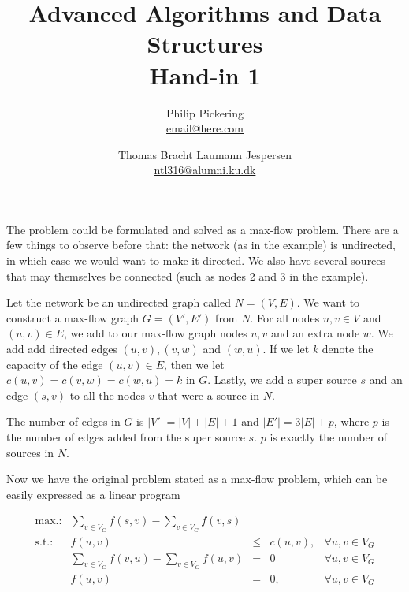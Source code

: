 \documentclass{article}
\author{Philip Pickering\\\url{email@here.com} \and Thomas Bracht Laumann Jespersen\\\url{ntl316@alumni.ku.dk}}
\title{Advanced Algorithms and Data Structures\\Hand-in 1}
\date{}
\begin{document}
\maketitle

The problem could be formulated and solved as a max-flow
problem. There are a few things to observe before that: the network
(as in the example) is undirected, in which case we would want to make
it directed. We also have several sources that may themselves be
connected (such as nodes 2 and 3 in the example).


Let the network be an undirected graph called $N = (V,E)$. We want to
construct a max-flow graph $G = (V',E')$ from $N$. For all nodes
$u,v\in V$ and $(u,v)\in E$, we add to our max-flow 
graph nodes $u, v$ and an extra node $w$. We add add directed edges
$(u,v), (v,w)$ and $(w,u)$. If we let $k$ denote the capacity of the
edge $(u,v)\in E$, then we let $c(u,v) = c(v,w) = c(w,u) = k$ in
$G$. Lastly, we add a super source $s$ and an edge $(s,v)$ to all the
nodes $v$ that were a source in $N$.

The number of edges in $G$ is $|V'| = |V| + |E| + 1 $ and $|E'| = 3|E|
+ p$, where $p$ is the number of edges added from the super source
$s$. $p$ is exactly the number of sources in $N$.

Now we have the original problem stated as a max-flow problem, which
can be easily expressed as a linear program

\[
\begin{array}{lrcll}
\textrm{max.:} & \displaystyle\sum_{v\in V_G} f(s,v) -\displaystyle\sum_{v\in V_G} f(v,s) &     & & \\
\textrm{s.t.:} &  f(u,v)                &\leq & c(u,v),  &\forall u,v\in V_G\\
              &  \displaystyle\sum_{v\in V_G}f(v,u) -\displaystyle\sum_{v\in V_G}f(u,v)                & =   & 0 &\forall u,v\in V_G\\
              & f(u,v) & = & 0, &\forall u,v\in V_G
\end{array}
\]
\end{document}
